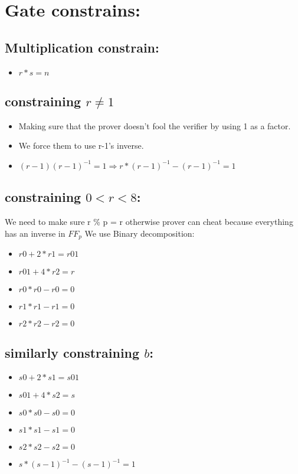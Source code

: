 \documentclass[11pt]{article}
\date{\today}
\title{}
\begin{document}
\section{Gate constrains:}
\label{sec:org949341d}

\subsection{Multiplication constrain:}
\label{sec:org23a6312}

\begin{itemize}
\item \(r * s = n\)
\end{itemize}

\subsection{constraining \(r \neq 1\)}
\label{sec:org60688ab}
\begin{itemize}
\item Making sure that the prover doesn't fool the verifier by using 1 as a factor.
\item We force them to use r-1's inverse.
\item \((r-1)(r-1)^{-1} = 1 \Rightarrow  r * (r-1)^{-1} - (r-1)^{-1} = 1\)
\end{itemize}

\subsection{constraining \(0< r < 8\):}
\label{sec:orgd3ea1d2}
We need to make sure r \% p = r
otherwise prover can cheat because everything has an inverse in \(FF_p\)
We use Binary decomposition:
\begin{itemize}
\item \(r0 + 2 * r1 = r01\)
\item \(r01 + 4 * r2 = r\)
\item \(r0 * r0 - r0 = 0\)
\item \(r1 * r1 - r1 = 0\)
\item \(r2 * r2 - r2 = 0\)
\end{itemize}

\subsection{similarly constraining \(b\):}
\label{sec:org3a9fab7}

\begin{itemize}
\item \(s0 + 2 * s1 = s01\)
\item \(s01 + 4 * s2 = s\)
\item \(s0 * s0 - s0 = 0\)
\item \(s1 * s1 - s1 = 0\)
\item \(s2 * s2 - s2 = 0\)
\item \(s * (s-1)^{-1} - (s-1)^{-1} = 1\)
\end{itemize}
\end{document}
